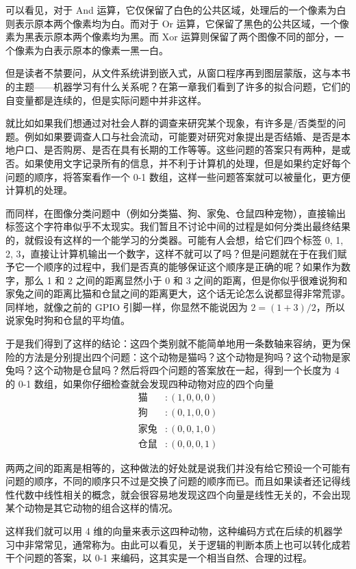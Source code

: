 可以看见，对于 And 运算，它仅保留了白色的公共区域，处理后的一个像素为白则表示原本两个像素均为白。而对于 Or 运算，它保留了黑色的公共区域，一个像素为黑表示原本两个像素均为黑。而 Xor 运算则保留了两个图像不同的部分，一个像素为白表示原本的像素一黑一白。

但是读者不禁要问，从文件系统讲到嵌入式，从窗口程序再到图层蒙版，这与本书的主题——机器学习有什么关系呢？在第一章我们看到了许多的拟合问题，它们的自变量都是连续的，但是实际问题中并非这样。

就比如如果我们想通过对社会人群的调查来研究某个现象，有许多是/否类型的问题。例如如果要调查人口与社会流动，可能要对研究对象提出是否结婚、是否是本地户口、是否购房、是否在具有长期的工作等等。这些问题的答案只有两种，是或否。如果使用文字记录所有的信息，并不利于计算机的处理，但是如果约定好每个问题的顺序，将答案看作一个 0-1 数组，这样一些问题答案就可以被量化，更方便计算机的处理。

而同样，在图像分类问题中（例如分类猫、狗、家兔、仓鼠四种宠物），直接输出标签这个字符串似乎不太现实。我们暂且不讨论中间的过程是如何分类出最终结果的，就假设有这样的一个能学习的分类器。可能有人会想，给它们四个标签 0, 1, 2, 3，直接让计算机输出一个数字，这样不就可以了吗？但是问题就在于在我们赋予它一个顺序的过程中，我们是否真的能够保证这个顺序是正确的呢？如果作为数字，那么 1 和 2 之间的距离显然小于 0 和 3 之间的距离，但是你似乎很难说狗和家兔之间的距离比猫和仓鼠之间的距离更大，这个话无论怎么说都显得非常荒谬。同样地，就像之前的 GPIO 引脚一样，你显然不能说因为 $2 = (1 + 3) / 2$，所以说家兔时狗和仓鼠的平均值。

于是我们得到了这样的结论：这四个类别就不能简单地用一条数轴来容纳，更为保险的方法是分别提出四个问题：这个动物是猫吗？这个动物是狗吗？这个动物是家兔吗？这个动物是仓鼠吗？然后将四个问题的答案放在一起，得到一个长度为 4 的 0-1 数组，如果你仔细检查就会发现四种动物对应的四个向量
\begin{align*}
    \text{猫}  & : (1, 0, 0, 0) \\
    \text{狗}  & : (0, 1, 0, 0) \\
    \text{家兔} & : (0, 0, 1, 0) \\
    \text{仓鼠} & : (0, 0, 0, 1)
\end{align*}

两两之间的距离是相等的，这种做法的好处就是说我们并没有给它预设一个可能有问题的顺序，不同的顺序只不过是交换了问题的顺序而已。而且如果读者还记得线性代数中线性相关的概念，就会很容易地发现这四个向量是线性无关的，不会出现某个动物是其它动物的组合这样的情况。

这样我们就可以用 4 维的向量来表示这四种动物，这种编码方式在后续的机器学习中非常常见，通常称为。由此可以看见，关于逻辑的判断本质上也可以转化成若干个问题的答案，以 0-1 来编码，这其实是一个相当自然、合理的过程。

